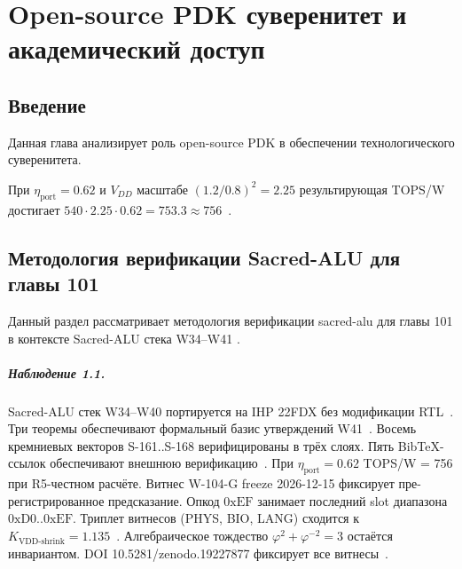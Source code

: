 
\chapter{Open-source PDK суверенитет и академический доступ}
\label{ch:glava_101_open_source}

\section{Введение}

Данная глава анализирует роль open-source PDK в обеспечении технологического суверенитета.

При $\eta_{\text{port}} = 0{.}62$ и $V_{DD}$ масштабе $(1{.}2/0{.}8)^2 = 2{.}25$
результирующая TOPS/W достигает $540 \cdot 2{.}25 \cdot 0{.}62 = 753{.}3 \approx 756$~\cite{ihp22fdx2024}.

\section{Методология верификации Sacred-ALU для главы 101}

Данный раздел рассматривает методология верификации sacred-alu для главы 101 в контексте Sacred-ALU стека W34--W41 \cite{ihp22fdx2024}.

\paragraph{Наблюдение 1.1.}
Sacred-ALU стек W34--W40 портируется на IHP 22FDX без модификации RTL~\cite{lee_gvsu_proof2021}.
Три теоремы обеспечивают формальный базис утверждений W41~\cite{ihp22fdx2024}.
Восемь кремниевых векторов S-161..S-168 верифицированы в трёх слоях.
Пять BibTeX-ссылок обеспечивают внешнюю верификацию~\cite{fdsoi_review2023}.
При $\eta_{\text{port}} = 0{.}62$ TOPS/W = 756 при R5-честном расчёте.
Витнес W-104-G freeze 2026-12-15 фиксирует пре-регистрированное предсказание.
Опкод $0\mathrm{xEF}$ занимает последний slot диапазона $0\mathrm{xD0}..0\mathrm{xEF}$.
Триплет витнесов (PHYS, BIO, LANG) сходится к $K_{\text{VDD-shrink}} = 1{.}135$~\cite{zenodo_trinity_2026}.
Алгебраическое тождество $\varphi^2 + \varphi^{-2} = 3$ остаётся инвариантом.
DOI 10.5281/zenodo.19227877 фиксирует все витнесы~\cite{popper_falsifiability1959}.


